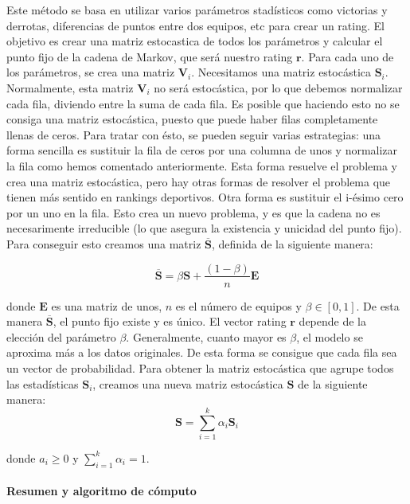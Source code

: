 Este método se basa en utilizar varios parámetros stadísticos como victorias y derrotas, diferencias de puntos entre dos equipos, etc para crear un rating. El objetivo es crear una matriz estocastica de todos los parámetros y calcular el punto fijo de la cadena de Markov, que será nuestro rating $\mathbf{r}$. Para cada uno de los parámetros, se crea una matriz $\mathbf{V}_i$. Necesitamos una matriz estocástica $\mathbf{S}_i$. Normalmente, esta matriz $\mathbf{V}_i$ no será estocástica, por lo que debemos normalizar cada fila, diviendo entre la suma de cada fila. Es posible que haciendo esto no se consiga una matriz estocástica, puesto que puede haber filas completamente llenas de ceros. Para tratar con ésto, se pueden seguir varias estrategias: una forma sencilla es sustituir la fila de ceros por una columna de unos y normalizar la fila como hemos comentado anteriormente. Esta forma resuelve el problema y crea una matriz estocástica, pero hay otras formas de resolver el problema que tienen más sentido en rankings deportivos.  Otra forma es sustituir el i-ésimo cero por un uno en la fila. Esto crea un nuevo problema, y es que la cadena no es necesarimente irreducible (lo que asegura la existencia y unicidad del punto fijo). Para conseguir esto creamos una matriz $\overline{\mathbf{S}}$, definida de la siguiente manera:

\begin{equation}
\overline{\mathbf{S}} = \beta \mathbf{S} + \dfrac{(1 - \beta)}{n} \mathbf{E}
\end{equation}

donde $\mathbf{E}$ es una matriz de unos, $n$ es el número de equipos y $\beta \in [0, 1]$. De esta manera $\overline{\mathbf{S}}$, el punto fijo existe y es único. El vector rating $\mathbf{r}$ depende de la elección del parámetro $\beta$. Generalmente, cuanto mayor es $\beta$, el modelo se aproxima más a los datos originales.  
De esta forma se consigue que cada fila sea un vector de probabilidad. Para obtener la matriz estocástica que agrupe todos las estadísticas $\mathbf{S}_i$, creamos una nueva matriz estocástica $\mathbf{S}$ de la siguiente manera: 
\begin{equation}
\mathbf{S} = \sum_{i=1}^{k} \alpha_i \mathbf{S}_i
\end{equation}

donde $a_i \geq 0$ y $\sum_{i=1}^{k} \alpha_i = 1$. 


\paragraph*{Resumen y algoritmo de cómputo}

